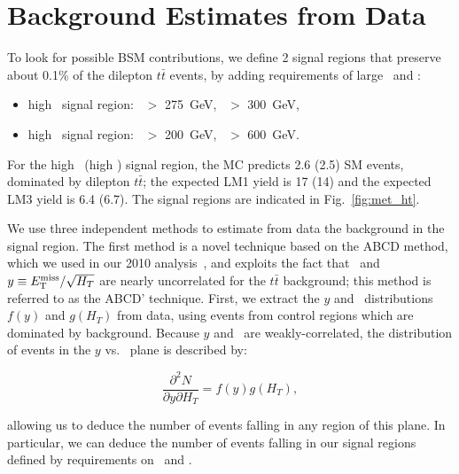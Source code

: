 \section{Background Estimates from Data}
\label{sec:datadriven}

To look for possible BSM contributions, we define 2 signal regions that preserve about 
0.1\% of the dilepton $t\bar{t}$ events, by adding requirements of large \MET\ and \Ht:

\begin{itemize}
\item high \MET\ signal region: \MET\ $>$ 275~GeV, \Ht\ $>$ 300~GeV,
\item high \Ht\ signal region:  \MET\ $>$ 200~GeV, \Ht\ $>$ 600~GeV.
\end{itemize}

For the high \MET\ (high \Ht) signal region, the MC predicts 2.6 (2.5) SM events, 
dominated by dilepton $t\bar{t}$; the expected LM1 yield is 17 (14) and the
expected LM3 yield is 6.4 (6.7). The signal regions are indicated in Fig.~\ref{fig:met_ht}.

We use three independent methods to estimate from data the background in the signal region.
The first method is a novel technique based on the ABCD method, which we used in our 2010 analysis~\cite{ref:ospaper}, 
and exploits the fact that \HT\ and $y \equiv E_{\mathrm{T}}^{\text{miss}}/\sqrt{H_T}$ are nearly uncorrelated for the $t\bar{t}$ background;
this method is referred to as the ABCD' technique. First, we extract the $y$ and \Ht\ distributions 
$f(y)$ and $g(H_T)$ from data, using events from control regions which are dominated by background. 
Because $y$ and \Ht\ are weakly-correlated, the distribution of events in the $y$ vs. \Ht\ plane is described by:

\begin{equation}
\frac{\partial^2 N}{\partial y \partial H_T} = f(y)g(H_T),
\end{equation}

allowing us to deduce the number of events falling in any region of this plane. In particular,
we can deduce the number of events falling in our signal regions defined by requirements on \MET\ and \Ht.

